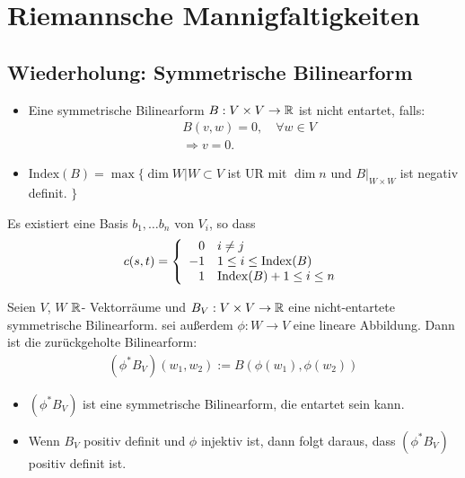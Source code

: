 \chapter{Riemannsche Mannigfaltigkeiten}

\section{Wiederholung: Symmetrische Bilinearform}
\begin{defs}
\begin{itemize}
\item Eine symmetrische Bilinearform $B: V \times V \to \mathbb{R}$ ist nicht entartet, falls:
\begin{align}
&B(v, w) = 0, \quad \forall w \in V\\
&\Rightarrow v = 0.
\end{align}
\item $\mathrm{Index}(B) = \max \{ \dim W \vert W \subset V $ ist UR mit $\dim n$ und $B\vert_{W \times W}$ ist negativ definit. $\}$
\end{itemize}
\end{defs}
Es existiert eine Basis ${b_1, \dots b_n}$ von $V_i$, so dass
\begin{align}
c(s, t) = \left\{
\begin{array}{ll}
\hphantom{-} 0 & i \neq j \\
-1 & 1\leq i \leq \mathrm{Index}(B)\\
\hphantom{-} 1 & \mathrm{Index}(B) + 1 \leq i \leq n\\
\end{array}
\right. 
\end{align}
\begin{defs}
Seien $V$, $W$ $\mathbb{R}$- Vektorräume und $B_V : V \times V \to \mathbb{R}$ eine nicht-entartete symmetrische Bilinearform.
sei außerdem $\phi : W \to V$ eine lineare Abbildung.
Dann ist die zurückgeholte Bilinearform:
\begin{align}
(\phi^\ast B_V) (w_1, w_2) := B(\phi(w_1), \phi(w_2))
\end{align}
\end{defs}
\begin{bem}\leavevmode
\begin{itemize}
\item $(\phi^\ast B_V)$ ist eine symmetrische Bilinearform, die entartet sein kann.
\item Wenn $B_V$ positiv definit und $\phi$ injektiv ist, dann folgt daraus, dass $(\phi^\ast B_V)$ positiv definit ist.
\end{itemize}
\end{bem}

